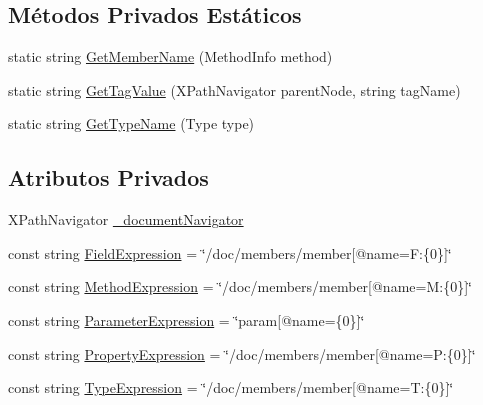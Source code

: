 \subsection*{Métodos Privados Estáticos}
\begin{DoxyCompactItemize}
\item 
static string \hyperlink{classApi3Layers_1_1Areas_1_1HelpPage_1_1XmlDocumentationProvider_aa747494e379de7a28d7e26920b30488c}{Get\+Member\+Name} (Method\+Info method)
\item 
static string \hyperlink{classApi3Layers_1_1Areas_1_1HelpPage_1_1XmlDocumentationProvider_a0e1628e2c68deb872bb816907d1ceab1}{Get\+Tag\+Value} (X\+Path\+Navigator parent\+Node, string tag\+Name)
\item 
static string \hyperlink{classApi3Layers_1_1Areas_1_1HelpPage_1_1XmlDocumentationProvider_ab7c2e772873d333e72ee649dddacc8e9}{Get\+Type\+Name} (Type type)
\end{DoxyCompactItemize}
\subsection*{Atributos Privados}
\begin{DoxyCompactItemize}
\item 
X\+Path\+Navigator \hyperlink{classApi3Layers_1_1Areas_1_1HelpPage_1_1XmlDocumentationProvider_a27bb462cb0252e12db3c94eb7cde784a}{\+\_\+document\+Navigator}
\item 
const string \hyperlink{classApi3Layers_1_1Areas_1_1HelpPage_1_1XmlDocumentationProvider_a495fb5f073620815f4bd9be5ac5a1c31}{Field\+Expression} = \char`\"{}/doc/members/member\mbox{[}@name=\textquotesingle{}F\+:\{0\}\textquotesingle{}\mbox{]}\char`\"{}
\item 
const string \hyperlink{classApi3Layers_1_1Areas_1_1HelpPage_1_1XmlDocumentationProvider_a8e2836494bbc0eef86c4200c2daaa489}{Method\+Expression} = \char`\"{}/doc/members/member\mbox{[}@name=\textquotesingle{}M\+:\{0\}\textquotesingle{}\mbox{]}\char`\"{}
\item 
const string \hyperlink{classApi3Layers_1_1Areas_1_1HelpPage_1_1XmlDocumentationProvider_a028743d93d156432c6d394821e2596dc}{Parameter\+Expression} = \char`\"{}param\mbox{[}@name=\textquotesingle{}\{0\}\textquotesingle{}\mbox{]}\char`\"{}
\item 
const string \hyperlink{classApi3Layers_1_1Areas_1_1HelpPage_1_1XmlDocumentationProvider_ae05dc5cbd300573ef5589d577745bf33}{Property\+Expression} = \char`\"{}/doc/members/member\mbox{[}@name=\textquotesingle{}P\+:\{0\}\textquotesingle{}\mbox{]}\char`\"{}
\item 
const string \hyperlink{classApi3Layers_1_1Areas_1_1HelpPage_1_1XmlDocumentationProvider_ae421a9b71e4e2b01b648d002549328f7}{Type\+Expression} = \char`\"{}/doc/members/member\mbox{[}@name=\textquotesingle{}T\+:\{0\}\textquotesingle{}\mbox{]}\char`\"{}
\end{DoxyCompactItemize}


